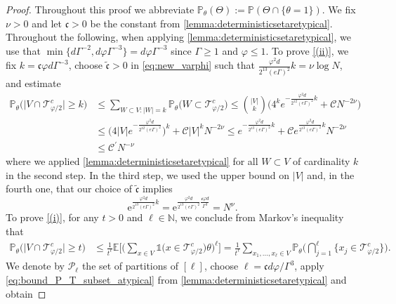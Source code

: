 \documentclass[10pt,a4paper]{amsart}
\newcommand{\ee}{\mathrm{e}}
\newcommand{\abs}[1]{\left| #1 \right|}
\newcommand{\absn}[1]{\bigl| #1 \bigr|} %
\newcommand{\N}{\mathbb{N}}
\newcommand{\ccc}{\mathfrak{c}}
\numberwithin{equation}{section}
\begin{document}
\begin{proof}
		Throughout this proof we abbreviate $\mathbb{P}_{\theta}(\Theta) := \mathbb{P}(\Theta \cap \{ \theta =1 \})$. We fix $\nu >0$ and let $\ccc>0$ be the constant from \cref{lemma:deterministicsetaretypical}. Throughout the following, when applying \cref{lemma:deterministicsetaretypical}, we use that $\min\{ d \Gamma^{-2},  d \varphi \Gamma^{-3}\}= d \varphi \Gamma^{-3}$ since $\Gamma \geq 1$ and $\varphi \leq 1$.
		To prove \cref{(ii)}, 
		 we fix  $k = \ccc \varphi d\Gamma^{-3}$, choose $\tilde{\ccc}>0$ 
		 in \cref{eq:new_varphi} such that $\frac{\varphi^2d}{2^{13} (e\Gamma)^2}k = \nu \log N $, and estimate
		\begin{align*}
			\mathbb{P}_{\theta}\big( \absn{V \cap \mathcal{T}_{\varphi/2}^c} \ge k \big) &\le \sum_{W \subset V:\abs{W}=k}\mathbb{P}_{\theta}\big( W \subset \mathcal{T}_{\varphi/2}^c \big) \le \binom{\abs{V}}{k} \Big( 4^{k} e^{-\frac{\varphi^2d}{2^{12} (e\Gamma)^2}k} + \mathcal{C}N^{-2 \nu}\Big)\\
			&\le \Big(4\abs{V}e^{-\frac{\varphi^2d}{2^{12}(e\Gamma)^2}}\Big)^k + \mathcal{C} \abs{V}^{k}N^{-2\nu}\le  e^{-\frac{\varphi^2d}{2^{13} (e\Gamma)^2}k}+ \mathcal{C}e^{\frac{\varphi^2d}{2^{13} (e\Gamma)^2}k} N^{-2\nu} \\
			&\le \mathcal{C^{\prime}} N^{-\nu}
		\end{align*}
where we applied \cref{lemma:deterministicsetaretypical} for all $ W \subset V$ of cardinality $k$ in the second step. In the third step, we used the upper bound on $\abs{V}$ and, in the fourth one, 
that our choice of $\tilde{\ccc}$ implies 
\begin{equation} \label{eq:choice_varphi_conclusion} 
\ee^{\frac{\varphi^2d}{2^{13} (e\Gamma)^2}k}= \ee^{\frac{\varphi^2d}{2^{13} (e\Gamma)^2} \frac{\ccc \varphi d}{\Gamma^3}} = N^{\nu}. 
\end{equation} 
To prove \cref{(i)}, for any $t>0$ and $\ell \in \N$, we conclude from Markov's inequality that 
\begin{align*}
			\mathbb{P}_{\theta} \big( \absn{V \cap \mathcal{T}_{\varphi/2}^c} \ge t \big) &\le \frac{1}{t^{\ell}} \mathbb{E} \biggl[ \biggl( \sum_{x \in V} \mathds{1}\big( x \in \mathcal{T}_{\varphi/2}^c \big) \theta \biggl)^{\ell}\biggr] = \frac{1}{t^\ell}\sum_{x_1,...,x_{\ell} \in V}\mathbb{P}_{\theta}\biggl( \bigcap_{j=1}^{\ell} \big\{x_j \in \mathcal{T}_{\varphi/2}^c \big\} \biggr).
		\end{align*}
	We denote by $\mathcal{P}_{\ell}$ the set of partitions of $[\ell]$, choose  $\ell =\ccc d\varphi/\Gamma^3$, apply \cref{eq:bound_P_T_subset_atypical} from \cref{lemma:deterministicsetaretypical} and obtain

\end{proof}
\end{document}
